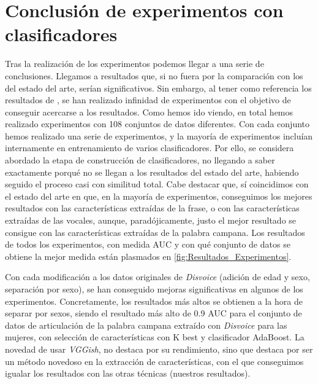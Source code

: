 \section{Conclusión de experimentos con clasificadores} \label{sec:resultados}
Tras la realización de los experimentos podemos llegar a una serie de conclusiones.
Llegamos a resultados que, si no fuera por la comparación con los del estado del arte, serían significativos. Sin embargo, al tener como referencia los resultados de \cite{Orz2016}, se han realizado infinidad de experimentos con el objetivo de conseguir acercarse a los resultados. Como hemos ido viendo, en total hemos realizado experimentos con 108 conjuntos de datos diferentes. Con cada conjunto hemos realizado una serie de experimentos, y la mayoría de experimentos incluían internamente en entrenamiento de varios clasificadores. Por ello, se considera abordado la etapa de construcción de clasificadores, no llegando a saber exactamente porqué no se llegan a los resultados del estado del arte, habiendo seguido el proceso casi con similitud total. Cabe destacar que, sí coincidimos con el estado del arte en que, en la mayoría de experimentos, conseguimos los mejores resultados con las características extraídas de la frase, o con las características extraídas de las vocales, aunque, paradójicamente, justo el mejor resultado se consigue con las características extraídas de la palabra campana. Los resultados de todos los experimentos, con medida AUC y con qué conjunto de datos se obtiene la mejor medida están plasmados en \ref{fig:Resultados_Experimentos}.

Con cada modificación a los datos originales de \textit{Disvoice} (adición de edad y sexo, separación por sexo), se han conseguido mejoras significativas en algunos de los experimentos. Concretamente, los resultados más altos se obtienen a la hora de separar por sexos, siendo el resultado más alto de 0.9 AUC para el conjunto de datos de articulación de la palabra campana extraído con \textit{Disvoice} para las mujeres, con selección de características con K best y clasificador AdaBoost.
La novedad de usar \textit{VGGish}, no destaca por su rendimiento, sino que destaca por ser un método novedoso en la extracción de características, con el que conseguimos igualar los resultados con las otras técnicas (nuestros resultados). 

